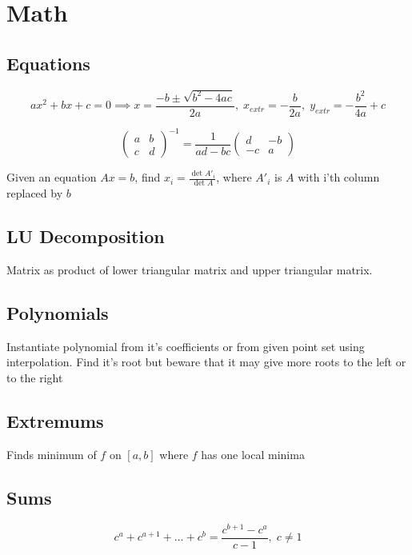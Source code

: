 \section{Math}

\subsection{Equations}

$$
ax^2 + bx + c = 0
\implies
x = \frac{-b \pm \sqrt{b^2 - 4ac}}{2a}
,\;
x_{extr} = -\frac{b}{2a}
,\;
y_{extr} = -\frac{b^2}{4a} + c
$$

$$
\begin{pmatrix}
  a & b \\
  c & d
\end{pmatrix}^{-1}
=
\frac1{ad - bc}
\begin{pmatrix}
  d & -b \\
  -c & a
\end{pmatrix}
$$

Given an equation $Ax = b$, find $x_i = \frac{\det A'_i}{\det A}$, where $A'_i$ is $A$ with i'th column replaced by $b$

\subsection{LU Decomposition}
Matrix as product of lower triangular matrix and upper triangular matrix. 

\subsection{Polynomials}
Instantiate polynomial from it's coefficients or from given point set using interpolation. Find it's root but beware that it may give more roots to the left or to the right

\subsection{Extremums}

Finds minimum of $f$ on $[a, b]$ where $f$ has one local minima

\subsection{Sums}

$$c^a + c^{a+1} + \ldots + c^b = \frac{c^{b+1} - c^a}{c - 1},\; c \ne 1$$

